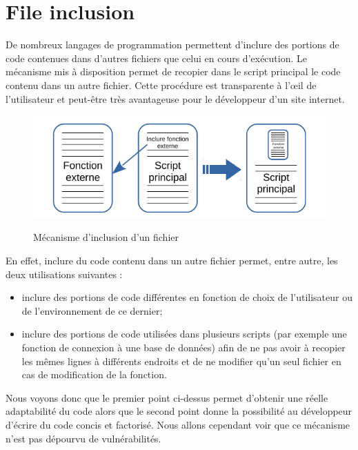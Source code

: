 
\newpage

\section{File inclusion}

De nombreux langages de programmation permettent d'inclure des portions de code contenues dans d'autres fichiers que celui en cours d'exécution. Le mécanisme mis à disposition permet de recopier dans le script principal le code contenu dans un autre fichier. Cette procédure est transparente à l'œil de l'utilisateur et peut-être très avantageuse pour le développeur d'un site internet.

\begin{figure}[!h]
\begin{center}

\label{inclusion}
\includegraphics[scale=1.2]{images/include.pdf}

\caption{Mécanisme d'inclusion d'un fichier}

\end{center}
\end{figure}

En effet, inclure du code contenu dans un autre fichier permet, entre autre, les deux utilisations suivantes :
\begin{itemize}
\item inclure des portions de code différentes en fonction de choix de l'utilisateur ou de l'environnement de ce dernier;
\item inclure des portions de code utilisées dans plusieurs scripts (par exemple une fonction de connexion à une base de données) afin de ne pas avoir à recopier les mêmes lignes à différents endroits et de ne modifier qu'un seul fichier en cas de modification de la fonction.
\end{itemize}


Nous voyons donc que le premier point ci-dessus permet d'obtenir une réelle adaptabilité du code alors que le second point donne la possibilité au développeur d'écrire du code concis et factorisé. Nous allons cependant voir que ce mécanisme n'est pas dépourvu de vulnérabilités.


